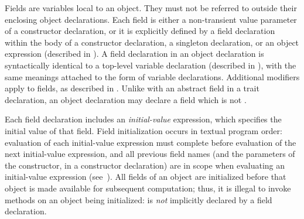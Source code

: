 Fields are variables local to an object.
They must not be referred to outside their enclosing object declarations.
Each field is either a non-transient value parameter of a constructor
declaration, or it is explicitly defined by a field declaration within the body of a constructor
declaration, a singleton declaration, or an object expression
(described in ).
A field declaration in an object declaration is syntactically identical to
a top-level variable declaration (described in ),
with the same meanings attached to the form of variable declarations.
Additional modifiers apply to fields, as described in .  Unlike with an abstract field in a trait declaration, an object declaration may declare a  field which is not .

Each field declaration includes an \emph{initial-value} expression,
which specifies the initial value of that field.
Field initialization occurs in textual program order:
evaluation of each initial-value expression
must complete before evaluation of the next initial-value expression,
and all previous field names
(and the parameters of the constructor,
in a constructor declaration)
are in scope when evaluating an initial-value expression
(see~).
All fields of an object are initialized
before that object is made available for subsequent computation;
thus,
it is illegal to invoke methods on
an object being initialized:
 is \emph{not} implicitly declared by a field declaration.

